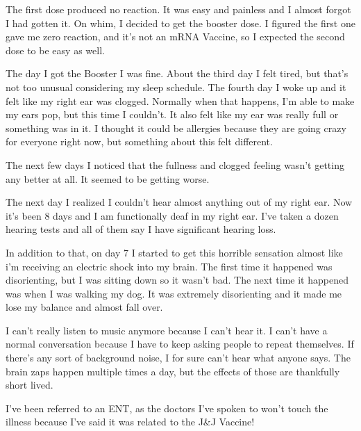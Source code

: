 The first dose produced no reaction. It was easy and painless and I almost
forgot I had gotten it. On whim, I decided to get the booster dose. I figured
the first one gave me zero reaction, and it’s not an mRNA Vaccine, so I expected
the second dose to be easy as well.

The day I got the Booster I was fine. About the third day I felt tired, but
that’s not too unusual considering my sleep schedule. The fourth day I woke up
and it felt like my right ear was clogged. Normally when that happens, I’m able
to make my ears pop, but this time I couldn’t. It also felt like my ear was
really full or something was in it. I thought it could be allergies because they
are going crazy for everyone right now, but something about this felt different.

The next few days I noticed that the fullness and clogged feeling wasn’t getting
any better at all. It seemed to be getting worse.

The next day I realized I couldn’t hear almost anything out of my right ear. Now
it’s been 8 days and I am functionally deaf in my right ear. I’ve taken a dozen
hearing tests and all of them say I have significant hearing loss.

In addition to that, on day 7 I started to get this horrible sensation almost
like i’m receiving an electric shock into my brain. The first time it happened
was disorienting, but I was sitting down so it wasn’t bad. The next time it
happened was when I was walking my dog. It was extremely disorienting and it
made me lose my balance and almost fall over.

I can’t really listen to music anymore because I can’t hear it. I can’t have a
normal conversation because I have to keep asking people to repeat
themselves. If there’s any sort of background noise, I for sure can’t hear what
anyone says. The brain zaps happen multiple times a day, but the effects of
those are thankfully short lived.

I’ve been referred to an ENT, as the doctors I’ve spoken to won’t touch the
illness because I’ve said it was related to the J\&J Vaccine!
